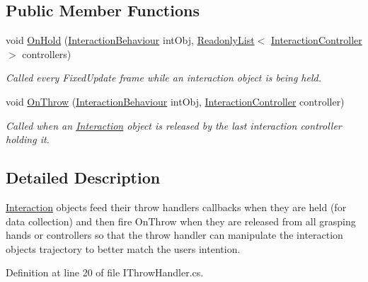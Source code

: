 \subsection*{Public Member Functions}
\begin{DoxyCompactItemize}
\item 
void \mbox{\hyperlink{interface_leap_1_1_unity_1_1_interaction_1_1_i_throw_handler_a416c8f5dc270ba95034487124b502079}{On\+Hold}} (\mbox{\hyperlink{class_leap_1_1_unity_1_1_interaction_1_1_interaction_behaviour}{Interaction\+Behaviour}} int\+Obj, \mbox{\hyperlink{struct_leap_1_1_unity_1_1_readonly_list}{Readonly\+List}}$<$ \mbox{\hyperlink{class_leap_1_1_unity_1_1_interaction_1_1_interaction_controller}{Interaction\+Controller}} $>$ controllers)
\begin{DoxyCompactList}\small\item\em Called every Fixed\+Update frame while an interaction object is being held. \end{DoxyCompactList}\item 
void \mbox{\hyperlink{interface_leap_1_1_unity_1_1_interaction_1_1_i_throw_handler_a29ebb0b201a7ae85dc484d91a716ecb6}{On\+Throw}} (\mbox{\hyperlink{class_leap_1_1_unity_1_1_interaction_1_1_interaction_behaviour}{Interaction\+Behaviour}} int\+Obj, \mbox{\hyperlink{class_leap_1_1_unity_1_1_interaction_1_1_interaction_controller}{Interaction\+Controller}} controller)
\begin{DoxyCompactList}\small\item\em Called when an \mbox{\hyperlink{namespace_leap_1_1_unity_1_1_interaction}{Interaction}} object is released by the last interaction controller holding it. \end{DoxyCompactList}\end{DoxyCompactItemize}


\subsection{Detailed Description}
\mbox{\hyperlink{namespace_leap_1_1_unity_1_1_interaction}{Interaction}} objects feed their throw handlers callbacks when they are held (for data collection) and then fire On\+Throw when they are released from all grasping hands or controllers so that the throw handler can manipulate the interaction object\textquotesingle{}s trajectory to better match the user\textquotesingle{}s intention. 



Definition at line 20 of file I\+Throw\+Handler.\+cs.




